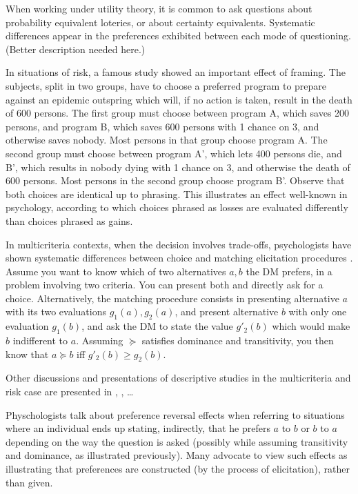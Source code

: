 \documentclass[french, english]{llncs}
\begin{document}
When working under utility theory, it is common to ask questions about probability equivalent loteries, or about certainty equivalents. Systematic differences appear in the preferences exhibited between each mode of questioning. (Better description needed here.) 

In situations of risk, a famous study \citep{tversky_1981} showed an important effect of framing. The subjects, split in two groups, have to choose a preferred program to prepare against an epidemic outspring which will, if no action is taken, result in the death of 600 persons. The first group must choose between program A, which saves 200 persons, and program B, which saves 600 persons with 1 chance on 3, and otherwise saves nobody. Most persons in that group choose program A. The second group must choose between program A', which lets 400 persons die, and B', which results in nobody dying with 1 chance on 3, and otherwise the death of 600 persons. Most persons in the second group choose program B'. Observe that both choices are identical up to phrasing. This illustrates an effect well-known in psychology, according to which choices phrased as losses are evaluated differently than choices phrased as gains.

In multicriteria contexts, when the decision involves trade-offs, psychologists have shown systematic differences between choice and matching elicitation procedures \citep{tversky_contingent_1988}. Assume you want to know which of two alternatives $a, b$ the \ac{DM} prefers, in a problem involving two criteria. You can present both and directly ask for a choice. Alternatively, the matching procedure consists in presenting alternative $a$ with its two evaluations $g_1(a), g_2(a)$, and present alternative $b$ with only one evaluation $g_1(b)$, and ask the \ac{DM} to state the value $g'_2(b)$ which would make $b$ indifferent to $a$. Assuming $\succeq$ satisfies dominance and transitivity, you then know that $a \succeq b$ iff $g'_2(b) ≥ g_2(b)$.

Other discussions and presentations of descriptive studies in the multicriteria and risk case are presented in \citet[Ch. 2]{deparis_2012}, \citet{slovic_construction_2006, Camerer and Ho (1994)}, …

Physchologists talk about preference reversal effects when referring to situations where an individual ends up stating, indirectly, that he prefers $a$ to $b$ or $b$ to $a$ depending on the way the question is asked (possibly while assuming transitivity and dominance, as illustrated previously). Many advocate to view such effects as illustrating that preferences are constructed (by the process of elicitation), rather than given.
\end{document}
